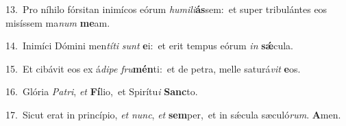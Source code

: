{\numbfont\textcolor{\numbcolor}{13.}}~Pro níhilo fórsitan inimícos eórum \textit{hu}\-\textit{mi}\textit{li}\textbf{ás}sem:~\star et super tribulántes eos misíssem ma\textit{num} \textbf{me}\-am.\par
{\numbfont\textcolor{\numbcolor}{14.}}~Inimíci Dómini men\-\textit{tí}\-\textit{ti} \textit{sunt} \textbf{e}\-i:~\star et erit tempus eórum \textit{in} \textbf{sǽ}\-cula.\par
{\numbfont\textcolor{\numbcolor}{15.}}~Et cibávit eos ex á\-\textit{di}\-\textit{pe} \textit{fru}\-\textbf{mén}ti:~\star et de petra, melle saturá\textit{vit} \textbf{e}\-os.\par
{\numbfont\textcolor{\numbcolor}{16.}}~Glória \textit{Pa}\-\textit{tri}, \textit{et} \textbf{Fí}\-lio,~\star et Spirítu\textit{i} \textbf{Sanc}\-to.\par
{\numbfont\textcolor{\numbcolor}{17.}}~Sicut erat in princípio, \textit{et} \textit{nunc}\-, \textit{et} \textbf{sem}\-per,~\star et in sǽcula sæculó\-\textit{rum}\-. \textbf{A}\-men.\par
